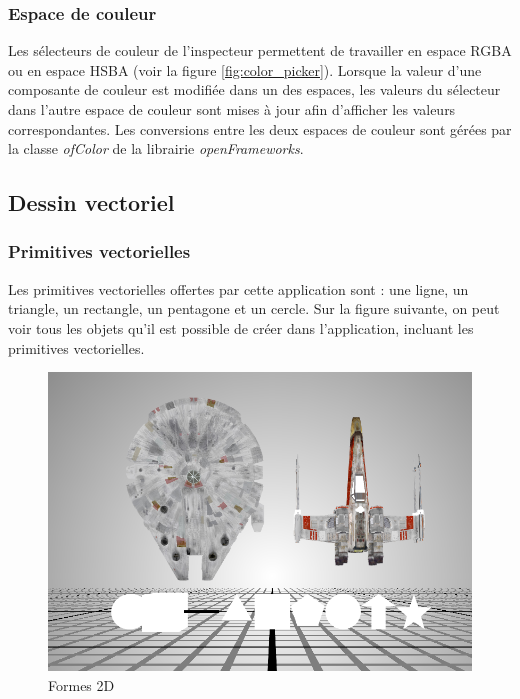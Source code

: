 \subsubsection{Espace de couleur}
Les sélecteurs de couleur de l'inspecteur permettent de travailler en espace RGBA ou en espace HSBA (voir la figure \ref{fig:color_picker}).
Lorsque la valeur d'une composante de couleur est modifiée dans un des espaces, les valeurs du sélecteur dans l'autre espace de couleur sont mises à jour afin d'afficher les valeurs correspondantes.
Les conversions entre les deux espaces de couleur sont gérées par la classe \emph{ofColor} de la librairie \emph{openFrameworks}.


\subsection{Dessin vectoriel}
\subsubsection{Primitives vectorielles}
Les primitives vectorielles offertes par cette application sont : une ligne, un triangle, un rectangle, un pentagone et un cercle.
Sur la figure suivante, on peut voir tous les objets qu'il est possible de créer dans l'application, incluant les primitives vectorielles.
\begin{figure}[H]
    \centering
	\includegraphics[scale=0.8]{fig/shapes.PNG}
	\caption{Formes 2D}
	\label{fig:primitives2D}
\end{figure}

